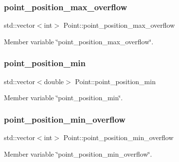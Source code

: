 \subsubsection{\texorpdfstring{point\+\_\+position\+\_\+max\+\_\+overflow}{point\_position\_max\_overflow}}
{\footnotesize\ttfamily std\+::vector$<$int$>$ Point\+::point\+\_\+position\+\_\+max\+\_\+overflow\hspace{0.3cm}{\ttfamily [private]}}



Member variable \char`\"{}point\+\_\+position\+\_\+max\+\_\+overflow\char`\"{}. 

\mbox{\label{classPoint_a2a1a9dcad0d1ef163b3ff0f35de8ddb4}} 
\subsubsection{\texorpdfstring{point\+\_\+position\+\_\+min}{point\_position\_min}}
{\footnotesize\ttfamily std\+::vector$<$double$>$ Point\+::point\+\_\+position\+\_\+min\hspace{0.3cm}{\ttfamily [private]}}



Member variable \char`\"{}point\+\_\+position\+\_\+min\char`\"{}. 

\mbox{\label{classPoint_a0c0cab60e2a94adce49302c2647b9c45}} 
\subsubsection{\texorpdfstring{point\+\_\+position\+\_\+min\+\_\+overflow}{point\_position\_min\_overflow}}
{\footnotesize\ttfamily std\+::vector$<$int$>$ Point\+::point\+\_\+position\+\_\+min\+\_\+overflow\hspace{0.3cm}{\ttfamily [private]}}



Member variable \char`\"{}point\+\_\+position\+\_\+min\+\_\+overflow\char`\"{}. 

\mbox{\label{classPoint_a087b62626654e6fabae0bdb483d03be9}} 
